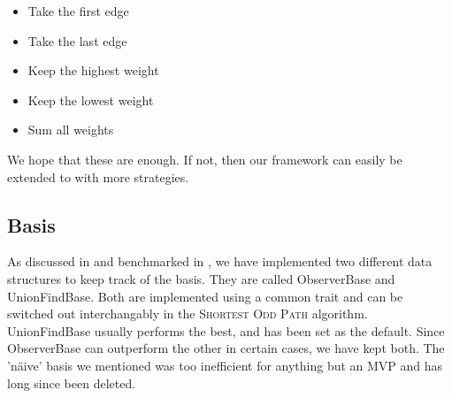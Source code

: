 \begin{itemize}
    \item Take the first edge
    \item Take the last edge
    \item Keep the highest weight
    \item Keep the lowest weight
    \item Sum all weights
\end{itemize}

We hope that these are enough. If not, then our framework can easily be extended to with more strategies.

\subsection{Basis}
As discussed in  and benchmarked in , we have implemented two different data structures to keep track of the basis. They are called ObserverBase and UnionFindBase. Both are implemented using a common trait and can be switched out interchangably in the \textsc{Shortest Odd Path} algorithm. UnionFindBase usually performs the best, and has been set as the default. Since ObserverBase can outperform the other in certain cases, we have kept both. The 'näive' basis we mentioned was too inefficient for anything but an MVP and has long since been deleted.
